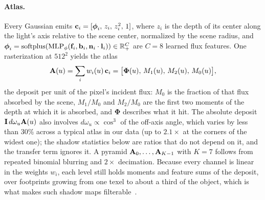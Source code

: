 \paragraph{Atlas.}
Every Gaussian emits $\mathbf{c}_i=[\boldsymbol\phi_i,\,z_i,\,z_i^2,\,1]$, where $z_i$ is the depth of its center along the light's axis relative to the scene center, normalized by the scene radius, and $\boldsymbol\phi_i=\operatorname{softplus}(\mathrm{MLP}_\phi(\mathbf{f}_i,\mathbf{b}_i,\mathbf{n}_i\cdot\mathbf{l}_i))\in\mathbb R_+^{C}$ are $C=8$ learned flux features.
One rasterization at $512^2$ yields the atlas
\begin{equation}
  \mathbf{A}(u)=\sum_i w_i(u)\,\mathbf{c}_i=\big[\boldsymbol\Phi(u),\,M_1(u),\,M_2(u),\,M_0(u)\big],
  \label{eq:atlas}
\end{equation}
the deposit per unit of the pixel's incident flux: $M_0$ is the fraction of that flux absorbed by the scene, $M_1/M_0$ and $M_2/M_0$ are the first two moments of the depth at which it is absorbed, and $\boldsymbol\Phi$ describes what it hit.
The absolute deposit $\mathbf{I}\,d\omega_u\mathbf{A}(u)$ also involves $d\omega_u\propto\cos^3$ of the off-axis angle, which varies by less than 30\% across a typical atlas in our data (up to $2.1\times$ at the corners of the widest one); the shadow statistics below are ratios that do not depend on it, and the transfer term ignores it.
A pyramid $\mathbf{A}_0,\dots,\mathbf{A}_{K-1}$ with $K=7$ follows from repeated binomial blurring and $2\times$ decimation.
Because every channel is linear in the weights $w_i$, each level still holds moments and feature sums of the deposit, over footprints growing from one texel to about a third of the object, which is what makes such shadow maps filterable~\cite{donnelly2006variance,peters2015moment}.

